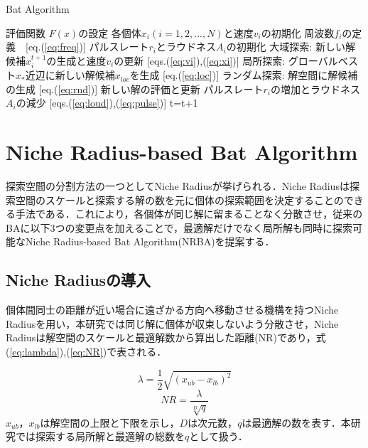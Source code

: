 \documentclass{jarticle}
\begin{document}
\begin{algorithm}[H]
\caption{Bat Algorithm}
\label{code:ba}
\begin{algorithmic}[1]
\REQUIRE 評価関数 $F(x)$の設定
\STATE 各個体$x_i(i=1,2,...,N)$と速度$v_i$の初期化
\STATE 周波数$f_i$の定義　[eq.(\ref{eq:freq})]
\STATE パルスレート$r_i$とラウドネス$A_i$の初期化
\STATE 大域探索: 新しい解候補$x_i^{t+1}$の生成と速度$v_i$の更新 [eqs.(\ref{eq:vi}),(\ref{eq:xi})]
{}
\STATE 局所探索: グローバルベスト$x_*$近辺に新しい解候補$x_{loc}$を生成 [eq.(\ref{eq:loc})]
\ENDIF
\STATE ランダム探索: 解空間に解候補の生成 [eq.(\ref{eq:rnd})]
\STATE 新しい解の評価と更新
\STATE パルスレート$r_i$の増加とラウドネス$A_i$の減少 [eqs.(\ref{eq:loud}),(\ref{eq:pulse})]
\ENDIF
\ENDFOR
\STATE t=t+1
\ENDWHILE
\end{algorithmic}
\end{algorithm}


\section{Niche Radius-based Bat Algorithm}
探索空間の分割方法の一つとしてNiche Radiusが挙げられる．Niche Radiusは探索空間のスケールと探索する解の数を元に個体の探索範囲を決定することのできる手法である．これにより，各個体が同じ解に留まることなく分散させ，従来のBAに以下3つの変更点を加えることで，最適解だけでなく局所解も同時に探索可能なNiche Radius-based Bat Algorithm(NRBA)を提案する．
\subsection{Niche Radiusの導入}
個体間同士の距離が近い場合に遠ざかる方向へ移動させる機構を持つNiche Radiusを用い，本研究では同じ解に個体が収束しないよう分散させ，Niche Radiusは解空間のスケールと最適解数から算出した距離(NR)であり，式(\ref{eq:lambda}),(\ref{eq:NR})で表される．

\begin{equation}
\label{eq:lambda}
\lambda =\frac{1}{2} \sqrt{(x_{ub}-x_{lb})^2}
\end{equation}
\begin{equation}
\label{eq:NR}
NR=\frac{\lambda}{\sqrt[D]{q}}
\end{equation}
$x_{ub}$，${x_{lb}}$は解空間の上限と下限を示し，${D}$は次元数，$q$は最適解の数を表す．本研究では探索する局所解と最適解の総数を$q$として扱う．
\end{document}
